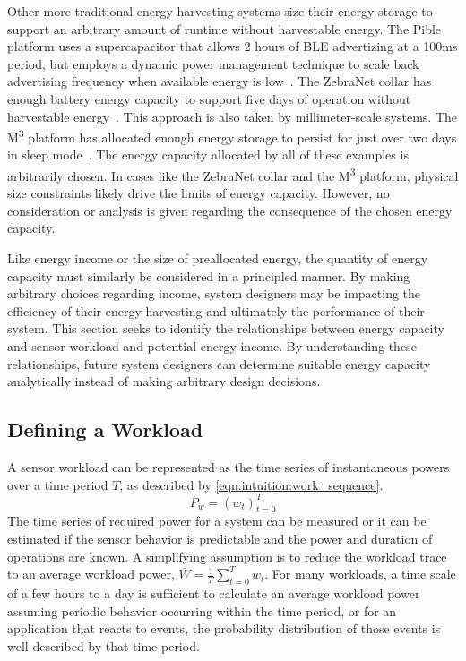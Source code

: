 Other more traditional energy harvesting systems size their energy storage to support an arbitrary amount of runtime without harvestable energy. 
The Pible platform uses a supercapacitor that allows 2 hours of BLE advertizing at a 100ms period, but employs a dynamic power management technique to scale back advertising frequency when available energy is low~\cite{fraternali2018pible}.
The ZebraNet collar has enough battery energy capacity to support five days of operation without harvestable energy~\cite{juang2002energy}. 
This approach is also taken by millimeter-scale systems. The M\textsuperscript{3} platform has allocated enough energy storage to persist for just over two days in sleep mode~\cite{lee2013modular}.
The energy capacity allocated by all of these examples is arbitrarily chosen. 
In cases like the ZebraNet collar and the M\textsuperscript{3} platform, physical size constraints likely drive the limits of energy capacity.
However, no consideration or analysis is given regarding the consequence of the chosen energy capacity.

Like energy income or the size of preallocated energy, the quantity of energy capacity must similarly be considered in a principled manner.
By making arbitrary choices regarding income, system designers may be impacting the efficiency of their energy harvesting and ultimately the performance of their system. 
This section seeks to identify the relationships between energy capacity and sensor workload and potential energy income.
By understanding these relationships, future system designers can determine suitable energy capacity analytically
instead of making arbitrary design decisions. 

\subsection{Defining a Workload}
A sensor workload can be represented as the time series of instantaneous powers over a time period $T$, as described by \cref{eqn:intuition:work_sequence}. 
\begin{equation} \label{eqn:intuition:work_sequence}
    P_w = (w_{t})^{T}_{t=0} 
\end{equation}
The time series of required power for a system can be measured or it can be estimated if the sensor behavior is predictable and the power and duration of operations are known.
A simplifying assumption is to reduce the workload trace to an average workload power, $\bar{W} = \frac{1}{T}\sum_{t=0}^T w_t$.
For many workloads, a time scale of a few hours to a day is sufficient to calculate an average workload power assuming periodic behavior occurring within the time period, or for an application that reacts to events, the probability distribution of those events is well described by that time period.


